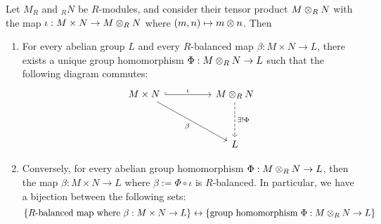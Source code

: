 \begin{thm}  \label{thm: uni prop tens}
    Let $M_R$ and $_RN$ be $R$-modules, and consider their tensor product $M\otimes_R N$ with the map $\iota:M\times N\to M\otimes_RN$ where $\left(m,n\right)\mapsto m\otimes n$. Then
    \begin{enumerate}
        \item For every abelian group $L$ and every $R$-balanced map $\beta:M\times N\to L$, there exists a unique group homomorphism $\Phi: M\otimes_R N\to L$ such that the following diagram commutes:
            \[\begin{tikzcd}
	           M\times N && M\ten_R N \\
	           \\
	           && L
	           \arrow["\iota", hook, from=1-1, to=1-3]
	           \arrow["\beta"', from=1-1, to=3-3]
	           \arrow["{\exists! \Phi}", dashed, from=1-3, to=3-3]
            \end{tikzcd}\]
        \item Conversely, for every abelian group homomorphism $\Phi:M\otimes_R N\to L$, then the map $\beta:M\times N\to L$ where $\beta:= \Phi\circ \iota$ is $R$-balanced. In particular, we have a bijection between the following sets:
        \[\left\{R \text{-balanced map where }\beta: M\times N\to L\right\}\leftrightarrow \left\{\text{group homomorphism } \Phi:M\otimes_R N \to L\right\}\]
    \end{enumerate}
\end{thm}
